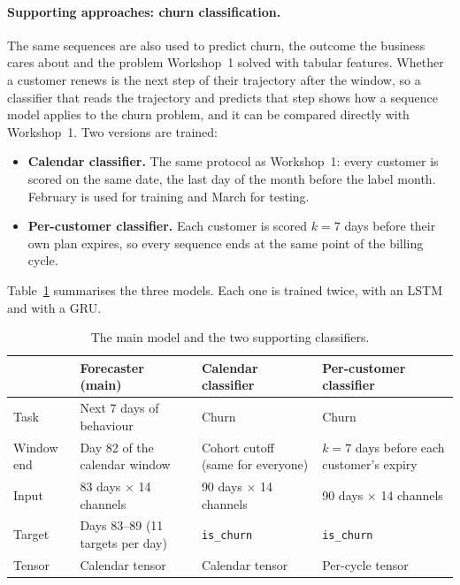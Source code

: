 \documentclass{article}
\begin{document}
\paragraph{Supporting approaches: churn classification.} The same sequences are also used to predict churn, the outcome the business cares about and the problem Workshop~1 solved with tabular features. Whether a customer renews is the next step of their trajectory after the window, so a classifier that reads the trajectory and predicts that step shows how a sequence model applies to the churn problem, and it can be compared directly with Workshop~1. Two versions are trained:
\begin{itemize}
    \item \textbf{Calendar classifier.} The same protocol as Workshop~1: every customer is scored on the same date, the last day of the month before the label month. February is used for training and March for testing.
    \item \textbf{Per-customer classifier.} Each customer is scored $k = 7$ days before their own plan expires, so every sequence ends at the same point of the billing cycle.
\end{itemize}
Table~\ref{tab:w2_approaches} summarises the three models. Each one is trained twice, with an LSTM and with a GRU.

\begin{table}[H]
\centering
\renewcommand{\arraystretch}{1.3}
\begin{tabularx}{\textwidth}{|l|X|X|X|}
\hline
 & \textbf{Forecaster (main)} & \textbf{Calendar classifier} & \textbf{Per-customer classifier} \\ \hline
Task & Next 7 days of behaviour & Churn & Churn \\ \hline
Window end & Day 82 of the calendar window & Cohort cutoff (same for everyone) & $k = 7$ days before each customer's expiry \\ \hline
Input & 83 days $\times$ 14 channels & 90 days $\times$ 14 channels & 90 days $\times$ 14 channels \\ \hline
Target & Days 83--89 (11 targets per day) & \texttt{is\_churn} & \texttt{is\_churn} \\ \hline
Tensor & Calendar tensor & Calendar tensor & Per-cycle tensor \\ \hline
\end{tabularx}
\caption{The main model and the two supporting classifiers.}
\label{tab:w2_approaches}
\end{table}
\end{document}
